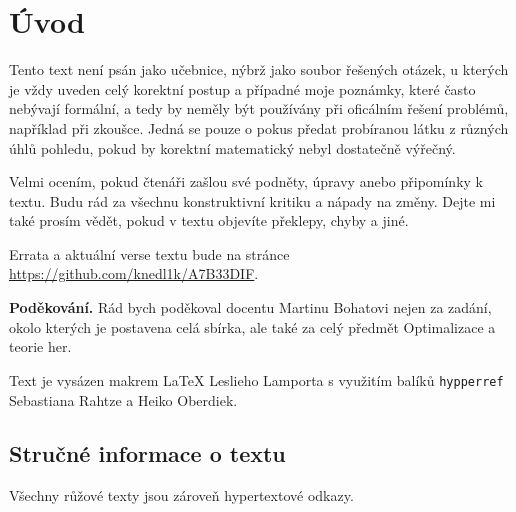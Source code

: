 \section*{Úvod}

\hspace{0.8cm} Tento text není psán jako učebnice, nýbrž jako soubor řešených otázek, u kterých je vždy uveden celý 
korektní postup a případné moje poznámky, které často nebývají formální, a tedy by neměly být používány při oficálním 
řešení problémů, například při zkoušce. Jedná se pouze o pokus předat probíranou látku z různých úhlů pohledu, pokud by 
korektní matematický nebyl dostatečně výřečný.

\hspace{0.8cm} Velmi ocením, pokud čtenáři zašlou své podněty, úpravy anebo připomínky k textu. Budu rád za všechnu 
konstruktivní kritiku a nápady na změny. Dejte mi také prosím vědět, pokud v textu objevíte překlepy, chyby a jiné.

Errata a aktuální verse textu bude na stránce \url{https://github.com/knedl1k/A7B33DIF}.

\textbf{Poděkování.} Rád bych poděkoval docentu Martinu Bohatovi nejen za zadání, okolo kterých je postavena celá sbírka,
ale také za celý předmět Optimalizace a teorie her.

\hspace{0.8cm} Text je vysázen makrem \LaTeX{} Leslieho Lamporta s využitím balíků \texttt{hypperref} \\ 
Sebastiana Rahtze a Heiko Oberdiek. 

\subsection*{Stručné informace o textu}
Všechny růžové texty jsou zároveň hypertextové odkazy.
